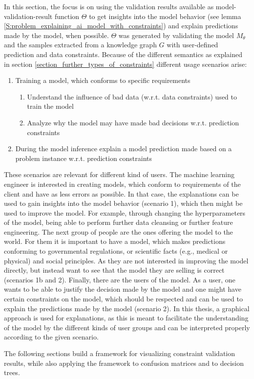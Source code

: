In this section, the focus is on using the validation results available as model-validation-result function $\Theta$ to get insights into the model behavior (see lemma \ref{S:problem_explaining_ai_model_with_constraints}) and explain predictions made by the model, when possible. $\Theta$ was generated by validating the model $M_\theta$ and the samples extracted from a knowledge graph $G$ with user-defined prediction and data constraints. Because of the different semantics as explained in section \ref{section_further_types_of_constraints} different usage scenarios arise:

\begin{enumerate}
    \item Training a model, which conforms to specific requirements
        \begin{enumerate}
            \item Understand the influence of bad data (w.r.t. data constraints) used to train the model 
            \item Analyze why the model may have made bad decisions w.r.t. prediction constraints
        \end{enumerate}
    \item During the model inference explain a model prediction made based on a problem instance w.r.t. prediction constraints
\end{enumerate}

These scenarios are relevant for different kind of users. The machine learning engineer is interested in creating models, which conform to requirements of the client and have as less errors as possible. In that case, the explanations can be used to gain insights into the model behavior (scenario 1), which then might be used to improve the model. For example, through changing the hyperparameters of the model, being able to perform further data cleansing or further feature engineering. The next group of people are the ones offering the model to the world. For them it is important to have a model, which makes predictions conforming to governmental regulations, or scientific facts (e.g., medical or physical) and social principles. As they are not interested in improving the model directly, but instead want to see that the model they are selling is correct (scenarios 1b and 2). Finally, there are the users of the model. As a user, one wants to be able to justify the decision made by the model and one might have certain constraints on the model, which should be respected and can be used to explain the predictions made by the model (scenario 2). In this thesis, a graphical approach is used for explanations, as this is meant to facilitate the understanding of the model by the different kinds of user groups and can be interpreted properly according to the given scenario.

The following sections build a framework for visualizing constraint validation results, while also applying the framework to confusion matrices and to decision trees.